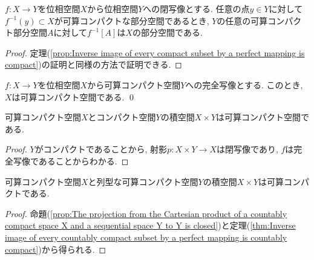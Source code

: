 \documentclass[uplatex, dvipdfmx, a4paper, 12pt, class=jsbook, crop=false]{standalone}
\begin{document}
\begin{theorem}
	\label{thm:Inverse image of every countably compact subset by a perfect mapping is countably compact}
	$ f \colon X \to Y $を位相空間$ X $から位相空間$ Y $への閉写像とする. 任意の点$ y \in Y $に対して$ f^{-1}(y) \subset X $が可算コンパクトな部分空間であるとき, $ Y $の任意の可算コンパクト部分空間$ A $に対して$ f^{-1}[A] $は$ X $の部分空間である.
\end{theorem}

\begin{proof}
	定理(\ref{prop:Inverse image of every compact subset by a perfect mapping is compact})の証明と同様の方法で証明できる.
\end{proof}


\begin{corollary}
	$ f \colon X \to Y $を位相空間$ X $から可算コンパクト空間$ Y $への完全写像とする. このとき, $ X $は可算コンパクト空間である. \qed
\end{corollary}

\begin{corollary}
	可算コンパクト空間$ X $とコンパクト空間$ Y $の積空間$ X \times Y $は可算コンパクト空間である.
\end{corollary}

\begin{proof}
	$ Y $がコンパクトであることから, 射影$ p \colon X \times Y \to X $は閉写像であり, $ f $は完全写像であることからわかる.
\end{proof}

\begin{corollary}
	可算コンパクト空間$ X $と列型な可算コンパクト空間$ Y $の積空間$ X \times Y $は可算コンパクトである.
\end{corollary}

\begin{proof}
	命題(\ref{prop:The projection from the Cartesian product of a countably compact space X and a sequential space Y to Y is closed})と定理(\ref{thm:Inverse image of every countably compact subset by a perfect mapping is countably compact})から得られる.
\end{proof}
\end{document}
